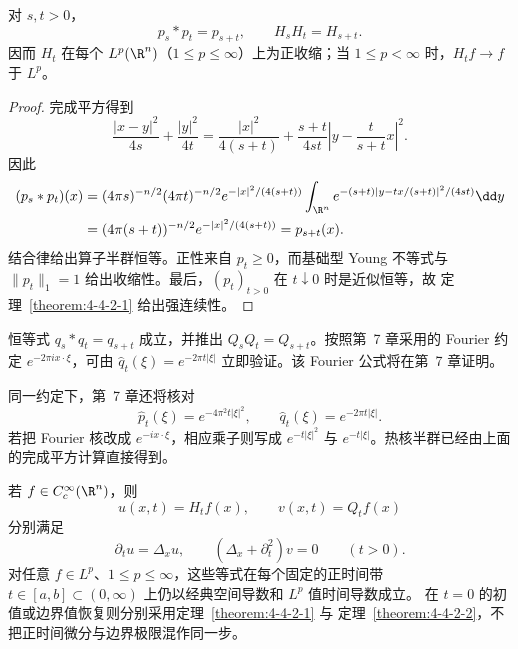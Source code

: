 \begin{proposition}[热核半群]\label{proposition:4-4-2-3}
对 $s,t>0$，
\[
 p_s*p_t=p_{s+t},\qquad H_sH_t=H_{s+t}.
\]
因而 $H_t$ 在每个 $L^p(\R^n)$（$1\le p\le\infty$）上为正收缩；当
$1\le p<\infty$ 时，$H_tf\to f$ 于 $L^p$。
\end{proposition}

\begin{proof}
完成平方得到
\[
 \frac{|x-y|^2}{4s}+\frac{|y|^2}{4t}
 =\frac{|x|^2}{4(s+t)}
 +\frac{s+t}{4st}\left|y-\frac{t}{s+t}x\right|^2.
\]
因此
\begin{align*}
 (p_s*p_t)(x)
 &=(4\pi s)^{-n/2}(4\pi t)^{-n/2}
 e^{-|x|^2/(4(s+t))}
 \int_{\R^n}e^{-(s+t)|y-tx/(s+t)|^2/(4st)}\dd y\\
 &=(4\pi(s+t))^{-n/2}e^{-|x|^2/(4(s+t))}=p_{s+t}(x).
\end{align*}
结合律给出算子半群恒等。正性来自 $p_t\ge0$，而基础型 Young 不等式与
$\|p_t\|_1=1$ 给出收缩性。最后，$(p_t)_{t>0}$ 在 $t\downarrow0$ 时是近似恒等，故
定理~\ref{theorem:4-4-2-1} 给出强连续性。
\end{proof}

\begin{remark}
恒等式 $q_s*q_t=q_{s+t}$ 成立，并推出 $Q_sQ_t=Q_{s+t}$。按照第~7 章采用的 Fourier 约定
$e^{-2\pi i x\cdot\xi}$，可由
$\widehat q_t(\xi)=e^{-2\pi t|\xi|}$ 立即验证。该 Fourier 公式将在第~7 章证明。

同一约定下，第~7 章还将核对
\[
 \widehat p_t(\xi)=e^{-4\pi^2t|\xi|^2},
 \qquad
 \widehat q_t(\xi)=e^{-2\pi t|\xi|}.
\]
若把 Fourier 核改成 $e^{-ix\cdot\xi}$，相应乘子则写成
$e^{-t|\xi|^2}$ 与 $e^{-t|\xi|}$。热核半群已经由上面的完成平方计算直接得到。
\end{remark}

\begin{proposition}\label{proposition:4-4-2-4}
若 $f\in C_c^\infty(\R^n)$，则
\[
 u(x,t)=H_tf(x),\qquad v(x,t)=Q_tf(x)
\]
分别满足
\[
 \partial_tu=\Delta_xu,\qquad
 (\Delta_x+\partial_t^2)v=0\qquad(t>0).
\]
对任意 $f\in L^p$、$1\le p\le\infty$，这些等式在每个固定的正时间带
$t\in[a,b]\subset(0,\infty)$ 上仍以经典空间导数和 $L^p$ 值时间导数成立。
在 $t=0$ 的初值或边界值恢复则分别采用定理~\ref{theorem:4-4-2-1} 与
定理~\ref{theorem:4-4-2-2}，不把正时间微分与边界极限混作同一步。
\end{proposition}

